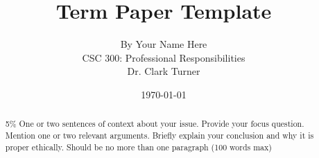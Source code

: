 \documentclass[11pt]{article}
\begin{document}
\title{\vfill Term Paper Template} %
\author{
By Your Name Here\vspace{10pt} \\ 
CSC 300: Professional Responsibilities\vspace{10pt} \\ 
Dr. Clark Turner\vspace{10pt} \\ 
}
\date{\today}

\maketitle

\vfill  %
\begin{abstract}
5\%  One or two sentences of context about your issue.  Provide your focus
question. Mention one or two relevant arguments.  Briefly explain your
conclusion and why it is proper ethically. Should be no more than one paragraph
(100 words max) \cite{handout}
\end{abstract}

\thispagestyle{empty} %
\newpage


\thispagestyle{empty}  %
\tableofcontents

\newpage

\end{document}
